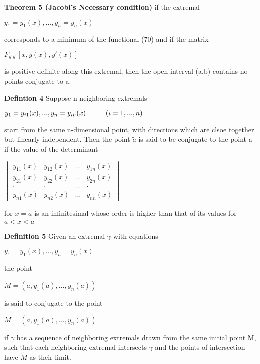 \documentclass{article}
\newcommand\tab[1][1cm]{\hspace*{#1}}
\begin{document}
\textbf {Theorem 5 (Jacobi's Necessary condition)} if the extremal 
\begin{center}
$y_1 = y_1 (x) ,..., y_n = y_n(x)$
\end{center}
corresponds to a minimum of the functional (70) and if the matrix
\begin{center}
$F_{y'y'}[x, y(x), y'(x)]$
\end{center}
is positive definite along this extremal, then the open interval (a,b) contains no points conjugate to a.

\textbf {Defintion 4} Suppose n neighboring extremals
\begin{center}
$y_1 = y_{i1}(x) ,..., y_n = y_{in}(x) \tab (i = 1,...,n)$
\end{center}
start from the same n-dimensional point, with directions which are clsoe together but linearly independent. Then the point $\tilde{a}$ is said to be conjugate to the point a if the value of the determinant 
\begin{center}
$\begin{vmatrix}
y_{11}(x) &  y_{12}(x) & \dots & y_{1n}(x) \\
y_{21}(x) & y_{22}(x) & \dots & y_{2n}(x) \\
\cdot &\cdot & \dots & \cdot \\
y_{n1}(x) & y_{n2}(x) & \dots & y_{nn}(x)
\end{vmatrix}
$
\end{center}
for $x = \tilde{a}$ is an infinitesimal whose order is higher than that of its values for $a < x < \tilde{a}$

\textbf {Definition 5} Given an extremal $\gamma$ with equations
\begin{center}
$y_1 = y_1(x) ,..., y_n = y_n(x)$
\end{center}
the point
\begin{center}
$\tilde{M} = (\tilde{a}, y_1(\tilde{a}) ,...,y_n(\tilde{a}))$
\end{center}
is said to conjugate to the point
\begin{center}
$M = (a, y_1(a),..., y_n(a))$
\end{center}
if $\gamma$ has a sequence of neighboring extremals drawn from the same initial point M, such that each neighboring extremal intersects $\gamma$ and the points of intersection have $\tilde{M}$ as their limit.
\end{document}
